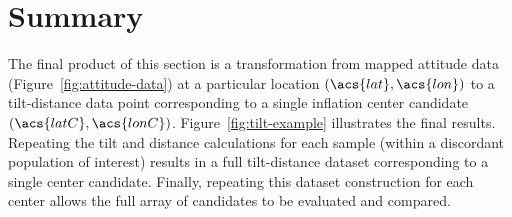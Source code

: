 





\section{Summary}

The final product of this section is a transformation from mapped attitude data (Figure~\ref{fig:attitude-data}) at a particular location $(\acs{lat}, \acs{lon})$ to a tilt-distance data point corresponding to a single inflation center candidate $(\acs{latC}, \acs{lonC})$. Figure~\ref{fig:tilt-example} illustrates the final results. Repeating the tilt and distance calculations for each sample (within a discordant population of interest) results in a full tilt-distance dataset corresponding to a single center candidate. Finally, repeating this dataset construction for each center allows the full array of candidates to be evaluated and compared.